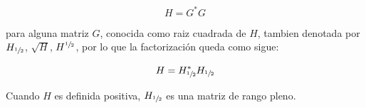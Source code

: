 \begin{teorema}
\begin{nota}
\begin{enumerate}
                \begin{equation*}
                    H = G^* G
                \end{equation*}

                para alguna matriz $G$, conocida como raiz cuadrada de $H$, tambien denotada por $H_{\sfrac{1}{2}}$, $\sqrt{H}$, $H^{\sfrac{1}{2}}$, por lo que la factorización queda como sigue:

                \begin{equation*}
                    H = H_{\sfrac{1}{2}}^* H_{\sfrac{1}{2}}
                \end{equation*}

                Cuando $H$ es definida positiva, $H_{\sfrac{1}{2}}$ es una matriz de rango pleno.
            \end{enumerate}
        \end{nota}
    \end{teorema}

